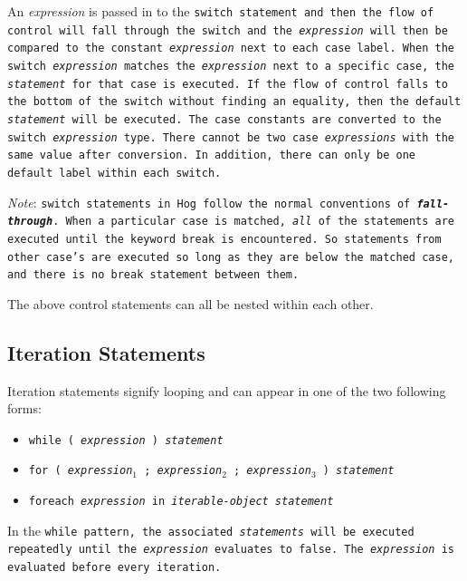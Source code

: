 \documentclass{article}
\begin{document}
An \emph{expression} is passed in to the \tt switch \rm statement and then the
flow of control will fall through the \tt switch \rm and the \emph{expression}
will then be compared to the constant \emph{expression} next to each \tt case \rm
label. When the \tt switch \rm \emph{expression} matches the \emph{expression}
next to a specific \tt case\rm, the \emph{statement} for that \tt case \rm is
executed. If the flow of control falls to the bottom of the \tt switch \rm without
finding an equality, then the \tt default \rm \emph{statement} will be executed.
The \tt case \rm constants are converted to the \tt switch \rm \emph{expression}
type. There cannot be two \tt case \rm \emph{expressions} with the same value
after conversion. In addition, there can only be one \tt default \rm label within
each \tt switch\rm.

\emph{Note}: \tt switch \rm statements in Hog follow the normal conventions of
\textbf{\emph{fall-through}}. When a particular \tt case \rm is matched,
\emph{all} of the statements are executed until the keyword \tt break \rm is
encountered. So statements from other \tt case\rm's are executed so long as they
are below the matched \tt case\rm, and there is no \tt break \rm statement between
them.

The above control statements can all be nested within each other.


\subsection{Iteration Statements} %
\label{sub:iteration_statements}

Iteration statements signify looping and can appear in one of the two following
forms:

\begin{itemize}
  \item[] \tt while ( \rm \emph{expression} \tt ) \rm \emph{statement}
  \item[] \tt for ( \rm \emph{expression}$_1$ \tt ; \rm \emph{expression}$_2$ \tt ; \rm \emph{expression}$_3$ \tt ) \rm \emph{statement}
  \item[] \tt foreach \rm \emph{expression} \tt in \rm \emph{iterable-object statement}
\end{itemize}

In the \tt while \rm pattern, the associated \emph{statements} will be executed
repeatedly until the \emph{expression} evaluates to \tt false\rm. The
\emph{expression} is evaluated before every iteration.
\end{document}
